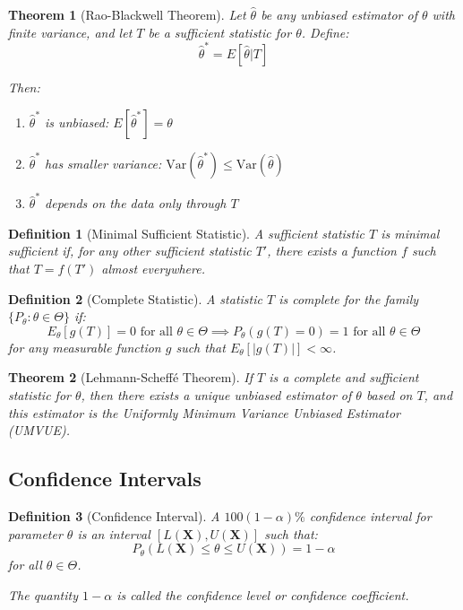 \documentclass[12pt,a4paper]{article}
\newtheorem{theorem}{Theorem}[section]
\newtheorem{definition}{Definition}[section]
\theoremstyle{remark}
\begin{document}
\begin{theorem}[Rao-Blackwell Theorem]
Let $\hat{\theta}$ be any unbiased estimator of $\theta$ with finite variance, and let $T$ be a sufficient statistic for $\theta$. Define:
$$\hat{\theta}^* = E[\hat{\theta} | T]$$

Then:
\begin{enumerate}
\item $\hat{\theta}^*$ is unbiased: $E[\hat{\theta}^*] = \theta$
\item $\hat{\theta}^*$ has smaller variance: $\text{Var}(\hat{\theta}^*) \leq \text{Var}(\hat{\theta})$
\item $\hat{\theta}^*$ depends on the data only through $T$
\end{enumerate}
\end{theorem}

\begin{definition}[Minimal Sufficient Statistic]
A sufficient statistic $T$ is minimal sufficient if, for any other sufficient statistic $T'$, there exists a function $f$ such that $T = f(T')$ almost everywhere.
\end{definition}

\begin{definition}[Complete Statistic]
A statistic $T$ is complete for the family $\{P_\theta : \theta \in \Theta\}$ if:
$$E_\theta[g(T)] = 0 \text{ for all } \theta \in \Theta \implies P_\theta(g(T) = 0) = 1 \text{ for all } \theta \in \Theta$$
for any measurable function $g$ such that $E_\theta[|g(T)|] < \infty$.
\end{definition}

\begin{theorem}[Lehmann-Scheffé Theorem]
If $T$ is a complete and sufficient statistic for $\theta$, then there exists a unique unbiased estimator of $\theta$ based on $T$, and this estimator is the Uniformly Minimum Variance Unbiased Estimator (UMVUE).
\end{theorem}

\subsection{Confidence Intervals}

\begin{definition}[Confidence Interval]
A $100(1-\alpha)\%$ confidence interval for parameter $\theta$ is an interval $[L(\mathbf{X}), U(\mathbf{X})]$ such that:
$$P_\theta(L(\mathbf{X}) \leq \theta \leq U(\mathbf{X})) = 1 - \alpha$$
for all $\theta \in \Theta$.

The quantity $1-\alpha$ is called the confidence level or confidence coefficient.
\end{definition}
\end{document}
